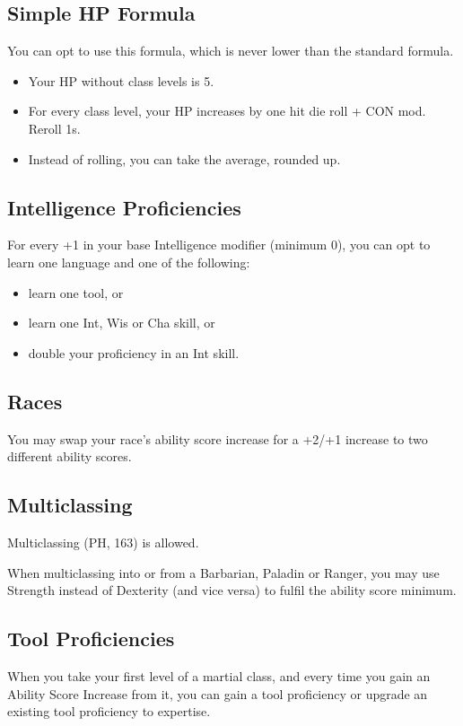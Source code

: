 \documentclass[letterpaper,twocolumn,openany,nodeprecatedcode,bg=print]{dndbook}
\begin{document}
\subsection{Simple HP Formula}
You can opt to use this formula, which is never lower than the standard formula.
\begin{itemize}
\item Your HP without class levels is 5.
\item For every class level, your HP increases by one hit die roll + CON mod. Reroll 1s. 
\item Instead of rolling, you can take the average, rounded up.
\end{itemize}

\subsection{Intelligence Proficiencies}
For every +1 in your base Intelligence modifier (minimum 0), 
you can opt to learn one language and one of the following:
\begin{itemize}
    \item learn one tool, or
    \item learn one Int, Wis or Cha skill, or
    \item double your proficiency in an Int skill.
\end{itemize}

\subsection{Races}
You may swap your race's ability score increase for a +2/+1 increase to two different ability scores.

\subsection{Multiclassing}
Multiclassing (PH, 163) is allowed. 

When multiclassing into or from a Barbarian, Paladin or Ranger, 
you may use Strength instead of Dexterity (and vice versa) to fulfil the ability score minimum. 

\subsection{Tool Proficiencies}
When you take your first level of a martial class, and every time you gain an Ability Score Increase from it, 
you can gain a tool proficiency or upgrade an existing tool proficiency to expertise. 
\end{document}
